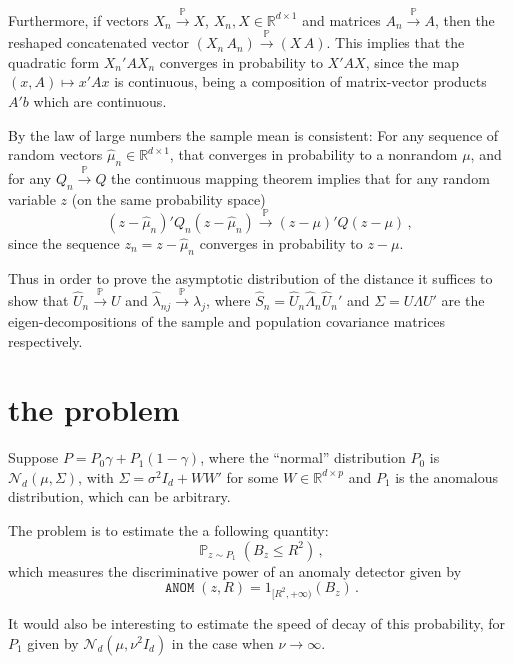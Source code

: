\documentclass[a4paper,14pt]{article}
\newcommand{\pr}{\mathop{\mathbb{P}}\nolimits}
\newcommand{\prto}{\overset{\pr}{\to}}
\begin{document}
Furthermore, if vectors $X_n\prto X$, $X_n, X \in\mathbb{R}^{d\times1}$ and matrices
$A_n\prto A$, then the reshaped concatenated vector $(X_n \,A_n) \prto (X\,A)$. This
implies that the quadratic form $X_n'A X_n$ converges in probability to $X'AX$, since
the map $(x, A) \mapsto x'Ax$ is continuous, being a composition of matrix-vector
products $A'b$ which are continuous.

By the law of large numbers the sample mean is consistent:
For any sequence of random vectors $\hat{\mu}_n\in\mathbb{R}^{d\times1}$, that
converges in probability to a nonrandom $\mu$, and for any $Q_n \prto Q$ the continuous
mapping theorem implies that for any random variable $z$ (on the same probability
space)
$$ (z-\hat{\mu}_n)'Q_n (z-\hat{\mu}_n) \prto (z-\mu)'Q(z-\mu) \,,$$
since the sequence $z_n = z - \hat{\mu}_n$ converges in probability to $z - \mu$.

Thus in order to prove the asymptotic distribution of the distance it suffices to show
that $\hat{U}_n \prto U $ and $\hat{\lambda}_{nj} \prto \lambda_j $,
where $\hat{S}_n = \hat{U}_n \hat{\Lambda}_n \hat{U}_n'$ and $\Sigma = U \Lambda U'$ are
the eigen-decompositions of the sample and population covariance matrices respectively.



\section{the problem} %
\label{sec:the_problem}

Suppose $P = P_0 \gamma + P_1 (1-\gamma)$, where the ``normal'' distribution $P_0$ is
$\mathcal{N}_d(\mu, \Sigma)$, with $\Sigma = \sigma^2 I_d + WW'$ for some $W\in \mathbb{R}^{d\times p}$
and $P_1$ is the anomalous distribution, which can be arbitrary.

The problem is to estimate the a following quantity:
$$ \pr_{z\sim P_1}(B_z \leq R^2) \,,$$
which measures the discriminative power of an anomaly detector
given by
$$ \mathop{\mathtt{ANOM}}(z, R) = 1_{[R^2, +\infty)}(B_z) \,.$$

It would also be interesting to estimate the speed of decay of this probability, for
$P_1$ given by $\mathcal{N}_d(\mu, \nu^2 I_d)$ in the case when $\nu\to \infty$.



\end{document}
